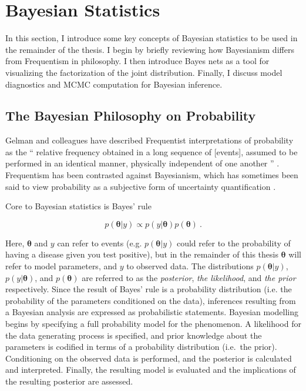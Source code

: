 \section{Bayesian Statistics}

In this section, I introduce some key concepts of Bayesian statistics to be used in the remainder of the thesis.  I begin by briefly reviewing how Bayesianism differs from Frequentism in philosophy.  I then introduce Bayes nets as a tool for visualizing the factorization of the joint distribution.  Finally, I discuss model diagnostics and MCMC computation for Bayesian inference.


\subsection{The Bayesian Philosophy on Probability}


Gelman and colleagues have described Frequentist interpretations of probability as the `` relative frequency obtained in a long sequence of [events], assumed to be performed in an identical manner, physically independent of one another ''   \cite[p.~12]{gelman2013bayesian}.   Frequentism has been contrasted against Bayesianism, which has sometimes been said to view probability as a subjective form of uncertainty quantification \cite{gelman2013bayesian}.

Core to Bayesian statistics is Bayes' rule \cite[p.~7]{gelman2013bayesian}

\begin{equation}\label{Bayes}
	p( \bm{\theta} \vert y) \propto p(y \vert \bm{\theta}) p(\bm{\theta}) \>.
\end{equation}

\noindent  Here, $ \bm{\theta} $  and $y$ can refer to events (e.g. $p(\bm{\theta} \vert y)$ could refer to the probability of having a disease given you test positive), but in the remainder of this thesis $\bm{\theta}$ will refer to model parameters, and $ y $ to observed data.  The distributions $ p( \bm{\theta} \vert y) $, $ p(y \vert \bm{\theta}) $, and $p(\bm{\theta})$ are referred to as the \textit{posterior}, \textit{the likelihood}, and \textit{the prior} respectively.  Since the result of Bayes' rule is a probability distribution (i.e. the probability of the parameters conditioned on the data), inferences resulting from a Bayesian analysis are expressed as probabilistic statements. Bayesian modelling begins by specifying a full probability model for the phenomenon.  A likelihood for the data generating process is specified, and prior knowledge about the parameters is codified in terms of a probability distribution (i.e.\ the prior).  Conditioning on the observed data is performed, and the posterior is calculated and interpreted.  Finally, the resulting model is evaluated and the implications of the resulting posterior are assessed.  


